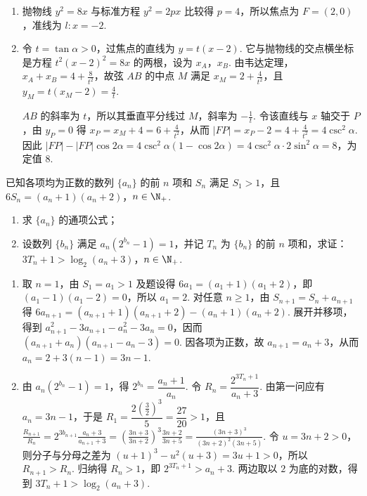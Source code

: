 \begin{solution}
\begin{enumerate}
\item 抛物线 \(y^2=8x\) 与标准方程 \(y^2=2px\) 比较得 \(p=4\)，所以焦点为 \(F=(2,0)\)，准线为 \(l:x=-2\).
\item 令 \(t=\tan\alpha>0\)，过焦点的直线为 \(y=t(x-2)\). 它与抛物线的交点横坐标是方程 \(t^2(x-2)^2=8x\) 的两根，设为 \(x_A\)，\(x_B\). 由韦达定理，\(x_A+x_B=4+\frac8{t^2}\)，故弦 \(AB\) 的中点 \(M\) 满足 \(x_M=2+\frac4{t^2}\)，且 \(y_M=t(x_M-2)=\frac4t\).

\(AB\) 的斜率为 \(t\)，所以其垂直平分线过 \(M\)，斜率为 \(-\frac1t\). 令该直线与 \(x\) 轴交于 \(P\)，由 \(y_P=0\) 得 \(x_P=x_M+4=6+\frac4{t^2}\)，从而 \(\lvert FP\rvert=x_P-2=4+\frac4{t^2}=4\csc^2\alpha\). 因此 \(\lvert FP\rvert-\lvert FP\rvert\cos2\alpha=4\csc^2\alpha(1-\cos2\alpha)=4\csc^2\alpha\cdot2\sin^2\alpha=8\)，为定值 \(8\).
\end{enumerate}
\end{solution}

\begin{problem}
已知各项均为正数的数列 \(\{a_{n}\}\) 的前 \(n\) 项和 \(S_{n}\) 满足 \(S_{1} > 1\)，且 \(6S_{n} = (a_{n} + 1)(a_{n} + 2)\)，\(n \in \N_{+}\).

\begin{enumerate}
\item 求 \( \{a_{n}\} \) 的通项公式；
\item 设数列 \(\{b_n\}\) 满足 \(a_n(2^{b_n} - 1) = 1\)，并记 \(T_n\) 为 \(\{b_n\}\) 的前 \(n\) 项和，求证：\(3T_n + 1 > \log_2(a_n + 3)\)，\(n \in \N_{+}\).
\end{enumerate}
\end{problem}

\begin{solution}
\begin{enumerate}
\item 取 \(n=1\)，由 \(S_1=a_1>1\) 及题设得 \(6a_1=(a_1+1)(a_1+2)\)，即 \((a_1-1)(a_1-2)=0\)，所以 \(a_1=2\). 对任意 \(n\geqslant1\)，由 \(S_{n+1}=S_n+a_{n+1}\) 得 \(6a_{n+1}=(a_{n+1}+1)(a_{n+1}+2)-(a_n+1)(a_n+2)\). 展开并移项，得到 \(a_{n+1}^{2}-3a_{n+1}-a_n^{2}-3a_n=0\)，因而 \((a_{n+1}+a_n)(a_{n+1}-a_n-3)=0\). 因各项为正数，故 \(a_{n+1}=a_n+3\)，从而 \(a_n=2+3(n-1)=3n-1\).
\item 由 \(a_n(2^{b_n}-1)=1\)，得 \(2^{b_n}=\dfrac{a_n+1}{a_n}\). 令 \(R_n=\dfrac{2^{3T_n+1}}{a_n+3}\). 由第一问应有 \(a_n=3n-1\)，于是 \(R_1=\dfrac{2(\frac{3}{2})^3}{5}=\dfrac{27}{20}>1\)，且
\(\frac{R_{n+1}}{R_n}=2^{3b_{n+1}}\frac{a_n+3}{a_{n+1}+3}=\left(\frac{3n+3}{3n+2}\right)^3\frac{3n+2}{3n+5}=\frac{(3n+3)^3}{(3n+2)^2(3n+5)}\). 令 \(u=3n+2>0\)，则分子与分母之差为 \((u+1)^3-u^2(u+3)=3u+1>0\)，所以 \(R_{n+1}>R_n\). 归纳得 \(R_n>1\)，即 \(2^{3T_n+1}>a_n+3\). 两边取以 \(2\) 为底的对数，得到 \(3T_n+1>\log_2(a_n+3)\).
\end{enumerate}
\end{solution}
